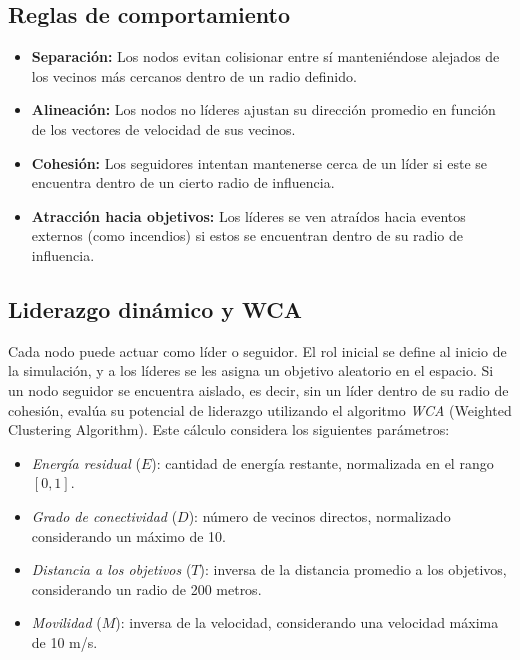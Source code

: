 \documentclass{article}
\begin{document}
\subsection{Reglas de comportamiento}

\begin{itemize}
    \item \textbf{Separación:} Los nodos evitan colisionar entre sí manteniéndose alejados de los vecinos más cercanos dentro de un radio definido.
    
    \item \textbf{Alineación:} Los nodos no líderes ajustan su dirección promedio en función de los vectores de velocidad de sus vecinos.
    
    \item \textbf{Cohesión:} Los seguidores intentan mantenerse cerca de un líder si este se encuentra dentro de un cierto radio de influencia.
    
    \item \textbf{Atracción hacia objetivos:} Los líderes se ven atraídos hacia eventos externos (como incendios) si estos se encuentran dentro de su radio de influencia.
\end{itemize}

\subsection{Liderazgo dinámico y WCA}

Cada nodo puede actuar como líder o seguidor. El rol inicial se define al inicio de la simulación, y a los líderes se les asigna un objetivo aleatorio en el espacio. Si un nodo seguidor se encuentra aislado, es decir, sin un líder dentro de su radio de cohesión, evalúa su potencial de liderazgo utilizando el algoritmo \textit{WCA} (Weighted Clustering Algorithm). Este cálculo considera los siguientes parámetros:

\begin{itemize}
    \item \textit{Energía residual} (\(E\)): cantidad de energía restante, normalizada en el rango \([0,1]\).
    \item \textit{Grado de conectividad} (\(D\)): número de vecinos directos, normalizado considerando un máximo de 10.
    \item \textit{Distancia a los objetivos} (\(T\)): inversa de la distancia promedio a los objetivos, considerando un radio de 200 metros.
    \item \textit{Movilidad} (\(M\)): inversa de la velocidad, considerando una velocidad máxima de 10 m/s.
\end{itemize}
\end{document}

